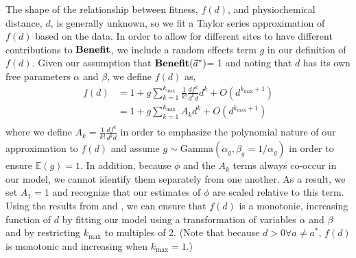 \documentclass{article}
\newcommand{\EE}{\mathbb{E}} %
\newcommand{\kmax}{\ensuremath{{k_{\max}}}\xspace}
\newcommand{\aopt}{\ensuremath{a^*}\xspace}
\newcommand{\aoptvec}{\ensuremath{\Vec{a}^*}\xspace}
\newcommand{\Func}{\ensuremath{\text{\textbf{Benefit}}}\xspace}
\newcommand{\Funcaoptvec}{\ensuremath{\Func(\aoptvec)}\xspace}
\begin{document}
The shape of the relationship between fitness, $f(d)$, and physiochemical distance, $d$, is generally unknown, so  we fit a Taylor series approximation of  $f(d)$ based on the data.
In order to allow for different sites to have different contributions to \Func, we include a random effects term $g$ in our definition of $f(d)$.
Given our assumption that \Funcaoptvec = 1 and noting that $d$ has its own free parameters $\alpha$ and $\beta$, we define $f(d)$ as,
\begin{align}
  \label{eq:fSeriesDef}
  f(d) &= 1 + g \sum_{k=1}^\kmax \frac{1}{k!}\frac{d f^k}{d^k d} d^k + O(d^{\kmax+1})\\
  & = 1 + g \sum_{k=1}^\kmax A_k d^k + O(d^{\kmax+1})\\
\end{align}
where we define $A_k = \frac{1}{k!}\frac{d f^k}{d^k d}$ in order to emphasize the polynomial nature of our approximation to $f(d)$ and assume $g \sim \text{Gamma}\left(\alpha_g, \beta_g = 1/\alpha_g\right)$ in order to ensure $\EE(g) = 1$.
In addition, because $\phi$ and the $A_k$ terms always co-occur in our model, we cannot identify them separately from one another.
As a result, we set $A_1 = 1$ and recognize that our estimates of $\phi$ are scaled relative to this term.
Using the results from \citet{Liang07} and \citet{Elphinstone85}, we can ensure that $f(d)$ is a monotonic, increasing function of $d$ by fitting our model using a transformation of variables $\alpha$ and $\beta$ and by restricting \kmax to multiples of 2. (Note that because $d > 0 \forall a \neq \aopt$, $f(d)$ is monotonic and increasing when $\kmax=1$.)
\end{document}
